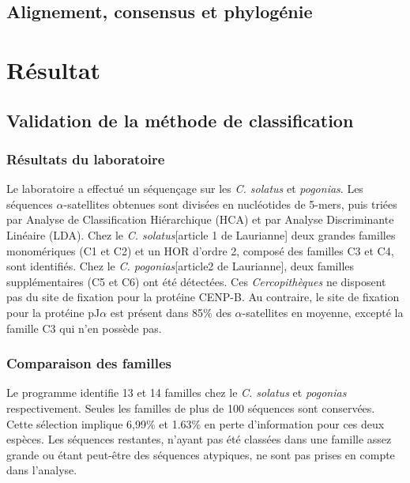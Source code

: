 \documentclass[12pt,a4paper]{article}
\begin{document}

\subsection{Alignement, consensus et phylogénie}
\section{Résultat}
	\subsection{Validation de la méthode de classification}
		\subsubsection{Résultats du laboratoire}
		Le laboratoire a effectué un séquençage sur les \textit{C. solatus} et \textit{pogonias}. Les séquences $\alpha$-satellites obtenues sont divisées en nucléotides de 5-mers, puis triées par Analyse de Classification Hiérarchique (HCA) et par Analyse Discriminante Linéaire (LDA). Chez le \textit{C. solatus}[article 1 de Laurianne] deux grandes familles monomériques (C1 et C2) et un HOR d'ordre 2, composé des familles C3 et C4, sont identifiés. Chez le \textit{C. pogonias}[article2 de Laurianne], deux familles supplémentaires (C5 et C6) ont été détectées. Ces \textit{Cercopithèques} ne disposent pas du site de fixation pour la protéine CENP-B. Au contraire, le site de fixation pour la protéine pJ$\alpha$ est présent dans 85\% des $\alpha$-satellites en moyenne, excepté la famille C3 qui n'en possède pas.  
		\subsubsection{Comparaison des familles}
		
Le programme identifie 13 et 14 familles chez le \textit{C. solatus} et \textit{pogonias} respectivement. Seules les familles de plus de 100 séquences sont conservées. Cette sélection implique 6,99\% et 1.63\% en perte d'information pour ces deux espèces. Les séquences restantes, n'ayant pas été classées dans une famille assez grande ou étant peut-être des séquences atypiques, ne sont pas prises en compte dans l'analyse. 
\end{document}
